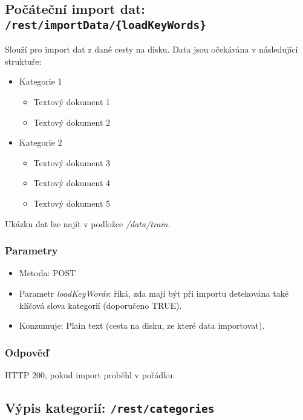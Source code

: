 \documentclass{article}
\begin{document}
\subsection{Počáteční import dat: \texttt{/rest/importData/\{loadKeyWords\}}}
\label{subsec:dataimport}
Slouží pro import dat z dané cesty na disku. Data jsou očekávána v následující struktuře:

\begin{itemize}
	\item Kategorie 1
		\begin{itemize}
			\item Textový dokument 1 
			\item Textový dokument 2
		\end{itemize}
	\item Kategorie 2
		\begin{itemize}
			\item Textový dokument 3 
			\item Textový dokument 4
			\item Textový dokument 5
		\end{itemize}
\end{itemize}

Ukázku dat lze najít v podložce \textit{/data/train}.

\subsubsection{Parametry}

\begin{itemize}
	\item Metoda: POST
	\item Parametr \textit{loadKeyWords}: říká, zda mají být při importu detekována také klíčová slova kategorií (doporučeno TRUE).
	\item Konzumuje: Plain text (cesta na disku, ze které data importovat).
\end{itemize}

\subsubsection{Odpověď}

HTTP 200, pokud import proběhl v pořádku.

\subsection{Výpis kategorií: \texttt{/rest/categories}}
\end{document}
